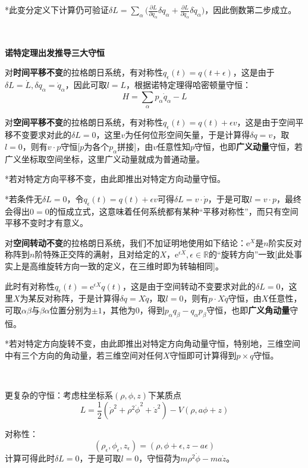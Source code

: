 \documentclass[a4paper,UTF8,fontset=windows]{ctexart}
\begin{document}
*此变分定义下计算仍可验证$\delta L=\sum_\alpha\big(\frac{\partial L}{\partial q_\alpha}\delta q_\alpha+\frac{\partial L}{\partial\dot{q}_\alpha}\delta\dot{q}_\alpha\big)$，因此倒数第二步成立。

\

\textbf{诺特定理出发推导三大守恒}

对\textbf{时间平移不变}的拉格朗日系统，有对称性$q_\epsilon(t)=q(t+\epsilon)$，这是由于$\delta L=\dot{L},\delta q_\alpha=\dot{q}_\alpha$，因此可取$l=L$，根据诺特定理得哈密顿量守恒：
$$H=\sum_\alpha p_\alpha\dot{q}_\alpha-L$$

对\textbf{空间平移不变}的拉格朗日系统，有对称性$q_\epsilon(t)=q(t)+\epsilon v$，这是由于空间平移不变要求对此的$\delta L=0$，这里$v$为任何位形空间矢量，于是计算得$\delta q=v$，取$l=0$，则有$v\cdot p$守恒[$p$为各个$p_\alpha$拼接]，由$v$任意性知$p$守恒，也即\textbf{广义动量}守恒，若广义坐标取空间坐标，这里广义动量就成为普通动量。

*若对特定方向平移不变，由此即推出对特定方向动量守恒。

*若条件无$\delta L=0$，令$q_\epsilon(t)=q(t)+\epsilon v$可得$\delta L=v\cdot\dot{p}$，于是可取$l=v\cdot p$，最终会得出$0=0$的恒成立式，这意味着任何系统都有某种“平移对称性”，而只有空间平移不变时才有意义。

对\textbf{空间转动不变}的拉格朗日系统，我们不加证明地使用如下结论：$\mathrm{e}^X$是$n$阶实反对称阵到$n$阶特殊正交阵的满射，且对给定的$X$，$\mathrm{e}^{\epsilon X},\epsilon\in\mathbb{R}$的“旋转方向”一致[此处事实上是高维旋转方向一致的定义，在三维时即为转轴相同]。

此时有对称性$q_\epsilon(t)=\mathrm{e}^{\epsilon X}q(t)$，这是由于空间转动不变要求对此的$\delta L=0$，这里$X$为某反对称阵，于是计算得$\delta q=X\dot{q}$，取$l=0$，则有$p\cdot X\dot{q}$守恒，由$X$任意性，可取$\alpha\beta$与$\beta\alpha$位置分别为$\pm1$，其他为0，得到$p_\alpha q_\beta-q_\alpha p_\beta$守恒，也即\textbf{广义角动量}守恒。

*若对特定方向旋转不变，由此即推出对特定方向角动量守恒，特别地，三维空间中有三个方向的角动量，若三维空间对任何$X$守恒即可计算得到$p\times q$守恒。

\

更复杂的守恒：考虑柱坐标系$(\rho,\phi,z)$下某质点
$$L=\frac{1}{2}(\dot{\rho}^2+\rho^2\dot{\phi}^2+\dot{z}^2)-V(\rho,a\phi+z)$$

对称性：
$$(\rho_\epsilon,\phi_\epsilon,z_\epsilon)=(\rho,\phi+\epsilon,z-a\epsilon)$$
计算可得此时$\delta L=0$，于是可取$l=0$，守恒荷为$m\rho^2\dot{\phi}-ma\dot{z}$。
\end{document}
